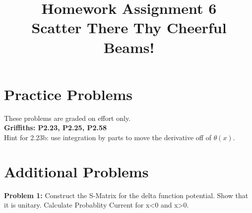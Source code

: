 \documentclass[12pt]{article}
\begin{document}
\newcommand{\ihbar}{\ensuremath{i \hbar}}
\newcommand{\dPsidt}{\ensuremath{ \frac{\partial \Psi}{\partial t} }}
\newcommand{\dPsidx}{\ensuremath{ \frac{\partial \Psi}{\partial x} }}
\newcommand{\ddPsidx}{\ensuremath{ \frac{\partial^2 \Psi}{\partial x^2} }}
\newcommand{\dPssdt}{\ensuremath{ \frac{\partial \Psi^*}{\partial t} }}
\newcommand{\dPssdx}{\ensuremath{ \frac{\partial \Psi^*}{\partial x} }}
\newcommand{\ddPssdx}{\ensuremath{ \frac{\partial^2 \Psi^*}{\partial x^2} }}

\newcommand{\dphidt}{\ensuremath{ \frac{d \phi}{dt} }}
\newcommand{\dpsidx}{\ensuremath{ \frac{d \psi}{dx} }}
\newcommand{\ddpsidx}{\ensuremath{ \frac{d^2 \psi}{dx^2} }}


\date{\vspace{-5ex}}

\title{Homework Assignment 6 \\ Scatter There Thy Cheerful Beams!}

\maketitle

\section*{Practice Problems}

These problems are graded on effort only.\\

\noindent
{\bf Griffiths: P2.23, P2.25, P2.58} \\
Hint for 2.23b:  use integration by parts to move the derivative off of $\theta(x)$.

\section*{Additional Problems}

\noindent
{\bf Problem 1:} 
Construct the S-Matrix for the delta function potential.
Show that it is unitary.
Calculate Probablity Current for x<0 and x>0.
\end{document}

